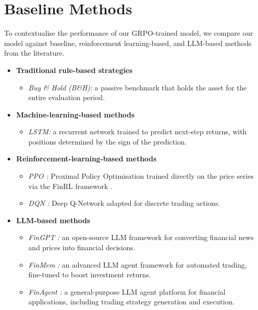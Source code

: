 \documentclass[12pt, a4paper]{report}
\begin{document}
\section{Baseline Methods}
\label{sec:baselines}
To contextualise the performance of our GRPO-trained model, we compare our model against baseline, reinforcement learning-based, and LLM-based methods from the literature. 
\begin{itemize}
  \item \textbf{Traditional rule-based strategies}
    \begin{itemize}
      \item \emph{Buy \& Hold (B\&H):} a passive benchmark that holds the asset for the entire
            evaluation period.
    \end{itemize}

  \item \textbf{Machine-learning-based methods}
    \begin{itemize}
      \item \emph{LSTM:} a recurrent network trained to predict next-step returns, with positions
            determined by the sign of the prediction.
    \end{itemize}

  \item \textbf{Reinforcement-learning-based methods}
    \begin{itemize}
      \item \emph{PPO \cite{schulman2017ppo}:} Proximal Policy Optimisation trained directly
            on the price series via the FinRL framework \cite{liu2021finrl}.
      \item \emph{DQN \cite{mnih2015human}:} Deep Q-Network adapted for discrete trading actions.
    \end{itemize}

  \item \textbf{LLM-based methods}
    \begin{itemize}
      \item \emph{FinGPT \cite{yang2023fingpt}:} an open-source LLM framework for converting
            financial news and prices into financial decisions.
      \item \emph{FinMem \cite{yu2023finmem}:} an advanced LLM agent framework for automated
            trading, fine-tuned to boost investment returns.
      \item \emph{FinAgent \cite{zhang2024finagent}:} a general-purpose LLM agent platform for
            financial applications, including trading strategy generation and execution.
    \end{itemize}
\end{itemize}
\end{document}
